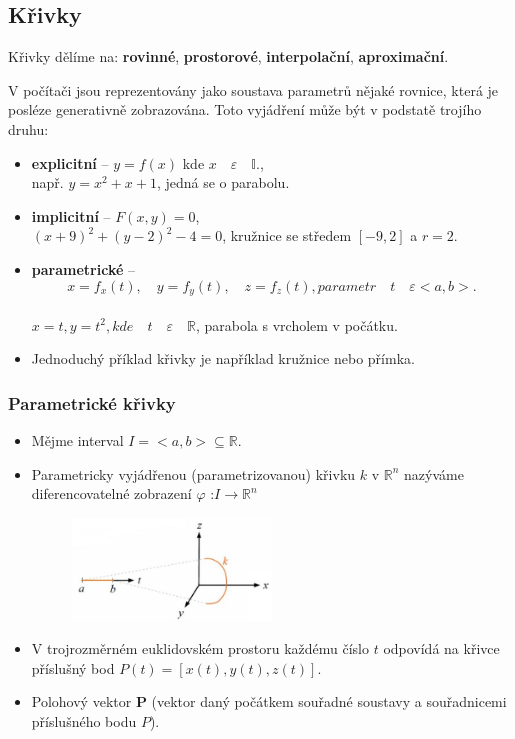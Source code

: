 \subsection{Křivky}
Křivky dělíme na: \textbf{rovinné}, \textbf{prostorové}, \textbf{interpolační}, \textbf{aproximační}.

V počítači jsou reprezentovány jako soustava parametrů nějaké rovnice, která je posléze generativně zobrazována. Toto vyjádření může být v podstatě trojího druhu:
\begin{itemize}
	\item \textbf{explicitní} -- $y = f(x)$  kde  $x \quad \varepsilon \quad  \mathbb{I}$.,\\ např. $y = x^{2} + x + 1$, jedná se o parabolu.
	\item \textbf{implicitní} -- $F(x, y) = 0$, \\		$(x+9)^{2} +(y −2)^{2} −4 = 0$, kružnice se středem $[−9, 2]$ a $r=2$.
	\item \textbf{parametrické} -- 		
	\begin{equation*}
				x = f_x(t), \quad y= f_y(t), \quad z = f_z(t), parametr \quad t \quad \varepsilon <a, b>.
		\end{equation*}
		\\		$x = t, y = t^{2}, kde \quad t \quad \varepsilon \quad \mathbb{R}$, parabola s vrcholem v počátku.
		\item Jednoduchý příklad křivky je například kružnice nebo přímka.
\end{itemize}

\subsubsection{Parametrické křivky}
\begin{itemize}
	\item Mějme interval $I = <a, b> \subseteq \mathbb{R}$.
	\item Parametricky vyjádřenou (parametrizovanou) křivku $k$ v $\mathbb{R}^n$ nazýváme diferencovatelné zobrazení $\varphi$  :$I \rightarrow \mathbb{R}^n$
\begin{figure}[H]
\centering
\includegraphics[width=0.5\textwidth]{assets/3_param_curve}
\end{figure}
	\item V trojrozměrném euklidovském prostoru každému číslo $t$ odpovídá na křivce příslušný bod $P(t) = [x(t), y(t), z(t)]$.
	\item Polohový vektor \textbf{P} (vektor daný počátkem souřadné soustavy a souřadnicemi příslušného bodu $P$).
\end{itemize}

